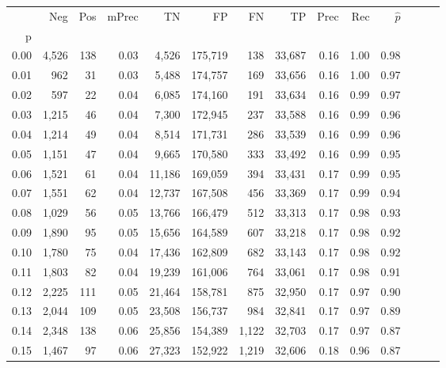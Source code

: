 \begin{tabular}{rrrrrrrrrrrrrr}
\toprule
{} &    Neg &    Pos & mPrec &       TN &       FP &      FN &      TP &  Prec &   Rec & $\hat{p}$ \\
p    &        &        &       &          &          &         &         &       &       &           \\
\midrule
0.00 &  4,526 &    138 &  0.03 &    4,526 &  175,719 &     138 &  33,687 &  0.16 &  1.00 &      0.98 \\
0.01 &    962 &     31 &  0.03 &    5,488 &  174,757 &     169 &  33,656 &  0.16 &  1.00 &      0.97 \\
0.02 &    597 &     22 &  0.04 &    6,085 &  174,160 &     191 &  33,634 &  0.16 &  0.99 &      0.97 \\
0.03 &  1,215 &     46 &  0.04 &    7,300 &  172,945 &     237 &  33,588 &  0.16 &  0.99 &      0.96 \\
0.04 &  1,214 &     49 &  0.04 &    8,514 &  171,731 &     286 &  33,539 &  0.16 &  0.99 &      0.96 \\
0.05 &  1,151 &     47 &  0.04 &    9,665 &  170,580 &     333 &  33,492 &  0.16 &  0.99 &      0.95 \\
0.06 &  1,521 &     61 &  0.04 &   11,186 &  169,059 &     394 &  33,431 &  0.17 &  0.99 &      0.95 \\
0.07 &  1,551 &     62 &  0.04 &   12,737 &  167,508 &     456 &  33,369 &  0.17 &  0.99 &      0.94 \\
0.08 &  1,029 &     56 &  0.05 &   13,766 &  166,479 &     512 &  33,313 &  0.17 &  0.98 &      0.93 \\
0.09 &  1,890 &     95 &  0.05 &   15,656 &  164,589 &     607 &  33,218 &  0.17 &  0.98 &      0.92 \\
0.10 &  1,780 &     75 &  0.04 &   17,436 &  162,809 &     682 &  33,143 &  0.17 &  0.98 &      0.92 \\
0.11 &  1,803 &     82 &  0.04 &   19,239 &  161,006 &     764 &  33,061 &  0.17 &  0.98 &      0.91 \\
0.12 &  2,225 &    111 &  0.05 &   21,464 &  158,781 &     875 &  32,950 &  0.17 &  0.97 &      0.90 \\
0.13 &  2,044 &    109 &  0.05 &   23,508 &  156,737 &     984 &  32,841 &  0.17 &  0.97 &      0.89 \\
0.14 &  2,348 &    138 &  0.06 &   25,856 &  154,389 &   1,122 &  32,703 &  0.17 &  0.97 &      0.87 \\
0.15 &  1,467 &     97 &  0.06 &   27,323 &  152,922 &   1,219 &  32,606 &  0.18 &  0.96 &      0.87 \\

\end{tabular}
